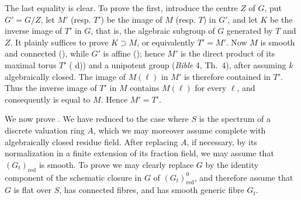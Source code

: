 The last equality is clear. To prove the first, introduce the centre \(Z\) of
\(G\), put \(G'=G/Z\), let \(M'\) (resp. \(T'\)) be the image of \(M\) (resp.
\(T\)) in \(G'\), and let \(K\) be the inverse image of \(T'\) in \(G\), that is,
the algebraic subgroup of \(G\) generated by \(T\) and \(Z\). It plainly suffices
to prove \(K\supset M\), or equivalently \(T'=M'\). Now \(M\) is smooth and
connected (), while \(G'\) is affine (); hence \(M'\) is the
direct product of its maximal torus \(T'\) ( d)) and a unipotent
group (\emph{Bible} 4, Th.~4), after assuming \(k\) algebraically closed. The image
of \(M(\ell)\) in \(M'\) is therefore contained in \(T'\). Thus the inverse image
of \(T'\) in \(M\) contains \(M(\ell)\) for every \(\ell\), and consequently is
equal to \(M\). Hence \(M'=T'\).

We now prove . We have reduced to the case where \(S\) is the spectrum of a
discrete valuation ring \(A\), which we may moreover assume complete with
algebraically closed residue field. After replacing \(A\), if necessary, by its
normalization in a finite extension of its fraction field, we may assume that
\((G_t)_{\mathrm{red}}\) is smooth. To prove  we may clearly replace \(G\) by the identity
component of the schematic closure in \(G\) of \((G_t)^0_{\mathrm{red}}\), and
therefore assume that \(G\) is flat over \(S\), has connected fibres, and has smooth
generic fibre \(G_t\).

